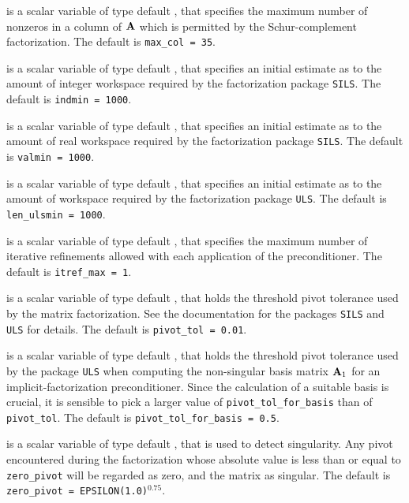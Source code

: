 \documentclass{galahad}
\begin{document}
\begin{description}
 is a scalar variable of type default \integer, that specifies
the maximum number of nonzeros in a column of ${\mathbf{A}}$ which is permitted
by the Schur-complement factorization.
The default is {\tt max\_col = 35}.

 is a scalar variable of type default \integer, that specifies
an initial estimate as to the amount of integer workspace required by
the factorization package {\tt SILS}.
The default is {\tt indmin = 1000}.

 is a scalar variable of type default \integer, that specifies
an initial estimate as to the amount of real workspace required by
the factorization package {\tt SILS}.
The default is {\tt valmin = 1000}.

 is a scalar variable of type default \integer, that specifies
an initial estimate as to the amount of workspace required by
the factorization package {\tt ULS}.
The default is {\tt len\_ulsmin = 1000}.

 is a scalar variable of type default \integer, that specifies
the maximum number of iterative refinements allowed with each application
of the preconditioner.
The default is {\tt itref\_max = 1}.



  is a scalar variable of type default
\realdp, that holds the
threshold pivot tolerance used by the matrix factorization.  See
the documentation for the packages {\tt SILS} and {\tt ULS} for details.
The default is {\tt pivot\_tol = 0.01}.

 is a scalar variable of type default
\realdp, that holds the
threshold pivot  tolerance used by the package {\tt ULS}
when computing the non-singular basis matrix ${\mathbf{A}}_1$ for
an implicit-factorization preconditioner. Since the calculation of a
suitable basis is crucial, it is sensible to pick a larger
value of {\tt pivot\_tol\_for\_basis} than of {\tt pivot\_tol}.
The default is {\tt pivot\_tol\_for\_basis = 0.5}.

 is a scalar variable of type default \realdp,
that is used to detect singularity. Any pivot encountered during the
factorization whose absolute value is less than or equal to  {\tt zero\_pivot}
will be regarded as zero, and the matrix as singular.
The default is {\tt zero\_pivot = EPSILON(1.0)}$^{0.75}$.


\end{description}
\end{document}
